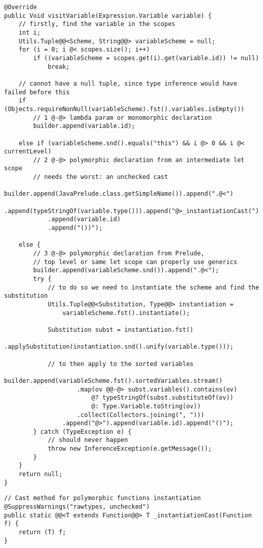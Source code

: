 \begin{lstlisting}[caption={Metodo \texttt{visit} per le variabili}, style=javaCode, label={lst:5-14-visit-variable-java}]
@Override
public Void visitVariable(Expression.Variable variable) {
    // firstly, find the variable in the scopes
    int i;
    Utils.Tuple@@<Scheme, String@@> variableScheme = null;
    for (i = 0; i @< scopes.size(); i++)
        if ((variableScheme = scopes.get(i).get(variable.id)) != null)
            break;

    // cannot have a null tuple, since type inference would have failed before this
    if (Objects.requireNonNull(variableScheme).fst().variables.isEmpty())
        // 1 @-@> lambda param or monomorphic declaration
        builder.append(variable.id);

    else if (variableScheme.snd().equals("this") && i @> 0 && i @< currentLevel)
        // 2 @-@> polymorphic declaration from an intermediate let scope 
        // needs the worst: an unchecked cast
        builder.append(JavaPrelude.class.getSimpleName()).append(".@<")
            .append(typeStringOf(variable.type())).append("@>_instantiationCast(")
            .append(variable.id)
            .append("())");

    else {
        // 3 @-@> polymorphic declaration from Prelude,
        // top level or same let scope can properly use generics
        builder.append(variableScheme.snd()).append(".@<");
        try {
            // to do so we need to instantiate the scheme and find the substitution
            Utils.Tuple@@<Substitution, Type@@> instantiation =
                variableScheme.fst().instantiate();

            Substitution subst = instantiation.fst()
                .applySubstitution(instantiation.snd().unify(variable.type()));

            // to then apply to the sorted variables
            builder.append(variableScheme.fst().sortedVariables.stream()
                    .map(ov @@-@> subst.variables().contains(ov)
                        @? typeStringOf(subst.substituteOf(ov))
                        @: Type.Variable.toString(ov))
                    .collect(Collectors.joining(", ")))
                .append("@>").append(variable.id).append("()");
        } catch (TypeException e) {
            // should never happen
            throw new InferenceException(e.getMessage());
        }
    }
    return null;
}
\end{lstlisting}
\vspace{4mm}
\begin{lstlisting}[caption={Metodo di istanziazione con \textit{cast}}, style=javaCode, label={lst:5-14-instantiation-cast-java}]
// Cast method for polymorphic functions instantiation
@SuppressWarnings("rawtypes, unchecked")
public static @@<T extends Function@@> T _instantiationCast(Function f) {
    return (T) f;
}
\end{lstlisting}

